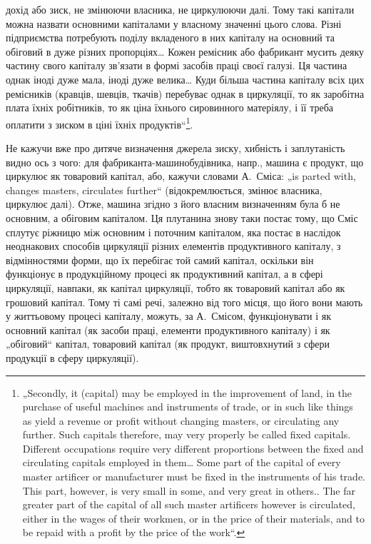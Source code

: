 \parcont{}  %
дохід або зиск, не змінюючи власника, не циркулюючи далі. Тому такі
капітали можна назвати основними капіталами у власному значенні цього
слова. Різні підприємства потребують поділу вкладеного в них капіталу
на основний та обіговий в дуже різних пропорціях\dots{} Кожен ремісник
або фабрикант мусить деяку частину свого капіталу зв’язати в формі
засобів праці своєї галузі. Ця частина однак іноді дуже мала, іноді дуже
велика\dots{} Куди більша частина капіталу всіх цих ремісників (кравців, шевців,
ткачів) перебуває однак в циркуляції, то як заробітна плата їхніх
робітників, то як ціна їхнього сировинного матеріялу, і її треба оплатити
з зиском в ціні їхніх продуктів“\footnote*{
„Secondly, it (capital) may be employed in the improvement of land, in the
purchase of useful machines and instruments of trade, or in such like things as
yield a revenue or profit without changing masters, or circulating any further. Such
capitals therefore, may very properly be called fixed capitals. Different occupations
require very different proportions between the fixed and circulating capitals employed
in them\dots{} Some part of the capital of every master artificer or manufacturer
must be fixed in the instruments of his trade. This part, however, is very small in
some, and very great in others.. The far greater part of the capital of all such master
artificers however is circulated, either in the wages of their workmen, or in the
price of their materials, and to be repaid with a profit by the price of the work“.
}.

Не кажучи вже про дитяче визначення джерела зиску, хибність і заплутаність
видно ось з чого: для фабриканта-машинобудівника, напр.,
машина є продукт, що циркулює як товаровий капітал, або, кажучи словами
А.~Сміса: „is parted with, changes masters, circulates further“ (відокремлюється,
змінює власника, циркулює далі). Отже, машина згідно з
його власним визначенням була б не основним, а обіговим капіталом. Ця
плутанина знову таки постає тому, що Сміс сплутує ріжницю між основним
і поточним капіталом, яка постає в наслідок неоднакових способів
циркуляції різних елементів продуктивного капіталу, з відмінностями
форми, що їх перебігає той самий капітал, оскільки він функціонує
в продукційному процесі як продуктивний капітал, а в сфері
циркуляції, навпаки, як капітал циркуляції, тобто як товаровий капітал
або як грошовий капітал. Тому ті самі речі, залежно від того місця, що
його вони мають у життьовому процесі капіталу, можуть, за А.~Смісом,
функціонувати і як основний капітал (як засоби праці, елементи продуктивного
капіталу) і як „обіговий“ капітал, товаровий капітал (як продукт,
виштовхнутий з сфери продукції в сферу циркуляції).

